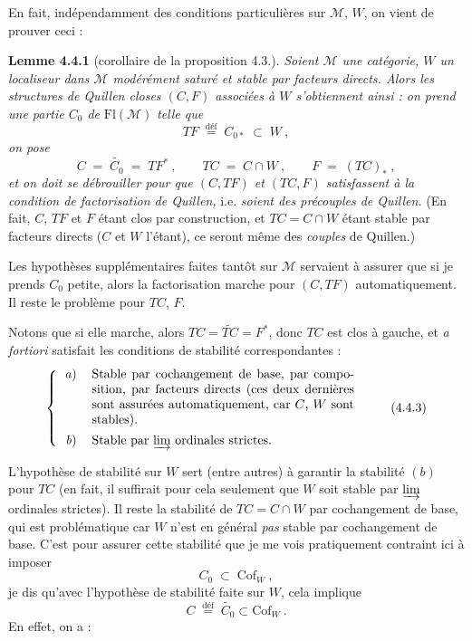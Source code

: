 \documentclass[11pt]{article}
\newcommand{\printedpage}[1]{\marginpar{\footnotesize p.~#1}}
\newcommand{\msp}[1]{\marginpar{\footnotesize [#1]}}
\newcommand{\Fl}{\mathrm{Fl}}
\newcommand{\Cof}{\mathrm{Cof}}
\newcommand{\deq}{\overset{\text{déf}}{=}}
\begin{document}
En fait, indépendamment des conditions particulières sur $\mathcal{M}$, $W$, on vient de prouver ceci :

\textbf{Lemme 4.4.1} (corollaire de la proposition 4.3.). \textit{Soient $\mathcal{M}$ une catégorie, $W$ un localiseur dans $\mathcal{M}$ modérément saturé et stable par facteurs directs. Alors les structures de Quillen closes $(C,F)$ associées à $W$ s'obtiennent ainsi : on prend une partie $C_0$ de} $\Fl(\mathcal{M})$ \textit{telle que}
\[
TF\;\deq\;C_{0*}\;\subset\;W\ ,
\]
\textit{on pose}
\[
C\;=\;\widetilde{C_0}\;=\;TF^*\ ,\qquad TC\;=\;C\cap W\ ,\qquad F\;=\;(TC)_*\ ,
\]
\textit{et on doit se débrouiller pour que $(C,TF)$ et $(TC,F)$ satisfassent à la condition de factorisation de Quillen,} i.e. \textit{soient des précouples de Quillen.} (En fait, $C$, $TF$ et $F$ étant clos par construction, et $TC=C\cap W$ étant stable par facteurs directs ($C$ et $W$ l'étant), ce seront même des \textit{couples} de Quillen.)

\msp{page 39}
Les hypothèses supplémentaires faites tantôt sur $\mathcal{M}$ servaient à assurer que si je prends $C_0$ petite, alors la factorisation marche pour $(C,TF)$ automatiquement. Il reste le problème pour $TC$, $F$.

Notons que si elle marche, alors $TC=\widetilde{TC}=F^*$, donc $TC$ est clos à gauche, et \textit{a fortiori} satisfait les conditions de stabilité correspondantes :
\[
\left\{
\begin{tabular}{rp{0.6\textwidth}}
\textit{a}) & Stable par cochangement de base, par composition, par facteurs directs (ces deux dernières sont assurées automatiquement, car $C$, $W$ sont stables).\\[1ex]
\textit{b}) & Stable par $\varinjlim$ ordinales strictes.
\end{tabular}
\right.
\tag*{(4.4.3)}
\]

L'hypothèse de stabilité sur $W$ sert (entre autres) à garantir la stabilité $(b)$ pour $TC$ (en fait, il suffirait pour cela seulement que $W$ soit stable par $\varinjlim$ ordinales strictes). Il reste la stabilité de $TC=C{\cap}W$ par cochangement de base, qui est problématique car $W$ n'est en général \textit{pas} stable par cochangement de base. C'est pour assurer cette stabilité que je me vois pratiquement contraint ici à imposer
\[
C_0\;\subset\;\Cof_W\ , \tag*{(4.4.4)}
\]
je dis qu'avec l'hypothèse de stabilité faite sur $W$, cela implique
\[
C\;\deq\;\widetilde{C_0}\subset\Cof_W\ . \tag*{(4.4.5)}
\]
\printedpage{27}
\msp{page 40}
En effet, on a :
\end{document}
